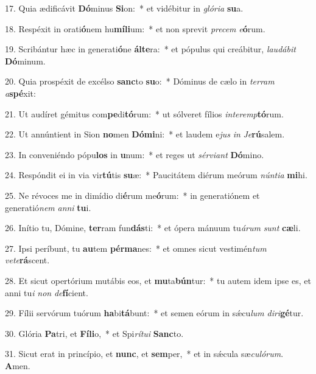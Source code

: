 17. Quia ædificávit \textbf{Dó}minus \textbf{Si}on:~*  et vidébitur in \textit{gló}\textit{ri}\textit{a} \textbf{su}a.\

18. Respéxit in orati\textbf{ó}nem hu\textbf{mí}\textbf{li}um:~*  et non sprevit \textit{pre}\textit{cem} \textit{e}\textbf{ó}rum.\

19. Scribántur hæc in generati\textbf{ó}ne \textbf{ál}\textbf{te}ra:~*  et pópulus qui creábitur, \textit{lau}\textit{dá}\textit{bit} \textbf{Dó}minum.\

20. Quia prospéxit de excélso \textbf{sanc}to \textbf{su}o:~*  Dóminus de cælo in \textit{ter}\textit{ram} \textit{a}\textbf{spé}xit:\

21. Ut audíret gémitus com\textbf{pe}di\textbf{tó}rum:~*  ut sólveret fílios \textit{in}\textit{ter}\textit{emp}\textbf{tó}rum.\

22. Ut annúntient in Sion \textbf{no}men \textbf{Dó}\textbf{mi}ni:~*  et laudem e\textit{jus} \textit{in} \textit{Je}\textbf{rú}salem.\

23. In conveniéndo pópu\textbf{los} in \textbf{u}num:~*  et reges ut \textit{sér}\textit{vi}\textit{ant} \textbf{Dó}mino.\

24. Respóndit ei in via vir\textbf{tú}tis \textbf{su}æ:~*  Paucitátem diérum meórum \textit{nún}\textit{ti}\textit{a} \textbf{mi}hi.\

25. Ne révoces me in dimídio di\textbf{é}rum me\textbf{ó}rum:~*  in generatiónem et generatió\textit{nem} \textit{an}\textit{ni} \textbf{tu}i.\

26. Inítio tu, Dómine, \textbf{ter}ram fun\textbf{dás}ti:~*  et ópera mánuum tu\textit{á}\textit{rum} \textit{sunt} \textbf{cæ}li.\

27. Ipsi períbunt, tu \textbf{au}tem \textbf{pér}\textbf{ma}nes:~*  et omnes sicut vestimén\textit{tum} \textit{ve}\textit{te}\textbf{rá}scent.\

28. Et sicut opertórium mutábis eos, et \textbf{mu}ta\textbf{bún}tur:~*  tu autem idem ipse es, et anni tu\textit{i} \textit{non} \textit{de}\textbf{fí}cient.\

29. Fílii servórum tuórum \textbf{ha}bi\textbf{tá}bunt:~*  et semen eórum in sǽcu\textit{lum} \textit{di}\textit{ri}\textbf{gé}tur.\

30. Glória \textbf{Pa}tri, et \textbf{Fí}\textbf{li}o,~*  et Spi\textit{rí}\textit{tu}\textit{i} \textbf{Sanc}to.\

31. Sicut erat in princípio, et \textbf{nunc}, et \textbf{sem}per,~*  et in sǽcula sæ\textit{cu}\textit{ló}\textit{rum}. \textbf{A}men.\

